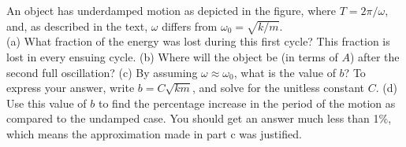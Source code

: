 %
An object has underdamped motion as depicted in the
figure, where $T = 2\pi/\omega$, and, as described in the text, $\omega$ differs
from $\omega_0=\sqrt{k/m}$.\\
%
(a) What fraction of the energy was lost during this first cycle?
This fraction is lost in every ensuing cycle.\answercheck\hwendpart
%
(b) Where will the object be (in terms of $A$) after the second full
oscillation?\answercheck\hwendpart
%
(c) By assuming $\omega \approx \omega_0$, what is the
value of $b$? To express your answer, write $b = C\sqrt{km}$, and
solve for the unitless constant $C$.\answercheck\hwendpart
%
(d) Use this value of $b$ to find the percentage increase in the
period of the motion as compared to the undamped case. You should get
an answer much less than 1\%, which means the approximation made in
part c was justified.\answercheck
